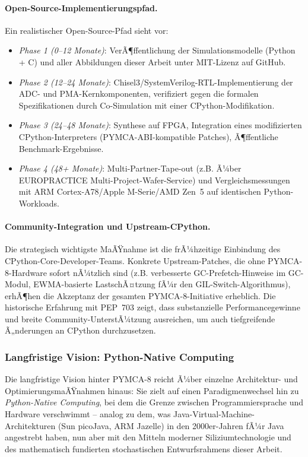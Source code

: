﻿\documentclass[a4paper,12pt]{scrreprt}
\theoremstyle{definition}
\begin{document}
	\paragraph{Open-Source-Implementierungspfad.}
	Ein realistischer Open-Source-Pfad sieht vor:
	\begin{itemize}[noitemsep]
		\item \emph{Phase 1 (0--12 Monate)}: VerÃ¶ffentlichung der Simulationsmodelle
		(Python + C) und aller Abbildungen dieser Arbeit unter MIT-Lizenz auf GitHub.
		\item \emph{Phase 2 (12--24 Monate)}: Chisel3/SystemVerilog-RTL-Implementierung
		der ADC- und PMA-Kernkomponenten, verifiziert gegen die formalen Spezifikationen
		durch Co-Simulation mit einer CPython-Modifikation.
		\item \emph{Phase 3 (24--48 Monate)}: Synthese auf FPGA, Integration eines
		modifizierten CPython-Interpreters (PYMCA-ABI-kompatible Patches), Ã¶ffentliche
		Benchmark-Ergebnisse.
		\item \emph{Phase 4 (48+ Monate)}: Multi-Partner-Tape-out (z.B. Ã¼ber EUROPRACTICE
		Multi-Project-Wafer-Service) und Vergleichsmessungen mit ARM Cortex-A78/Apple
		M-Serie/AMD Zen~5 auf identischen Python-Workloads.
	\end{itemize}

	\paragraph{Community-Integration und Upstream-CPython.}
	Die strategisch wichtigste MaÃŸnahme ist die frÃ¼hzeitige Einbindung des
	CPython-Core-Developer-Teams. Konkrete Upstream-Patches, die ohne PYMCA-8-Hardware
	sofort nÃ¼tzlich sind (z.B. verbesserte GC-Prefetch-Hinweise im GC-Modul,
	EWMA-basierte LastschÃ¤tzung fÃ¼r den GIL-Switch-Algorithmus), erhÃ¶hen die
	Akzeptanz der gesamten PYMCA-8-Initiative erheblich. Die historische Erfahrung
	mit PEP~703 zeigt, dass substanzielle Performancegewinne und breite
	Community-UnterstÃ¼tzung ausreichen, um auch tiefgreifende Ã„nderungen an
	CPython durchzusetzen.

	\subsubsection{Langfristige Vision: Python-Native Computing}

	Die langfristige Vision hinter PYMCA-8 reicht Ã¼ber einzelne Architektur-
	und OptimierungsmaÃŸnahmen hinaus: Sie zielt auf einen Paradigmenwechsel
	hin zu \emph{Python-Native Computing}, bei dem die Grenze zwischen
	Programmiersprache und Hardware verschwimmt -- analog zu dem, was
	Java-Virtual-Machine-Architekturen (Sun picoJava, ARM Jazelle) in den
	2000er-Jahren fÃ¼r Java angestrebt haben, nun aber mit den Mitteln moderner
	Siliziumtechnologie und des mathematisch fundierten stochastischen
	Entwurfsrahmens dieser Arbeit.
\end{document}
